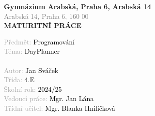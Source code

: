 \thispagestyle{empty}
\begin{titlepage}
    \begin{center}
        \vspace*{1cm}

        {\Large \textbf{Gymnázium Arabská, Praha 6, Arabská 14}} \\
        \vspace{0.5cm} 
        \textcolor{gray}{\large Arabská 14, Praha 6, 160 00}\\
        \vspace{5cm} 
        {\Large \textbf{MATURITNÍ PRÁCE}}\\
        \vspace{5cm}
    \end{center}
    \textcolor{darkgray}{\large
    Předmět:\hspace{0.2cm} \textcolor{black}{Programování}\\
    Téma:\hspace{0.2cm} \textcolor{black}{DayPlanner}\\
    \vspace{0.8cm} \\
    Autor:\hspace{0.2cm} \textcolor{black}{Jan Sváček} \\
    Třída:\hspace{0.2cm} \textcolor{black}{4.E} \\
    Školní rok:\hspace{0.2cm} \textcolor{black}{2024/25} \\
    Vedoucí práce:\hspace{0.2cm} \textcolor{black}{Mgr. Jan Lána} \\
    Třídní učitel:\hspace{0.2cm} \textcolor{black}{Mgr. Blanka Hniličková} \\
    }
    
    
\end{titlepage}